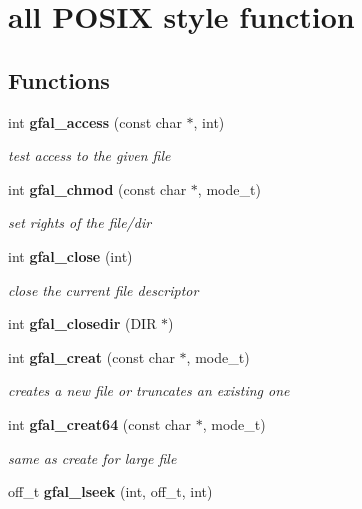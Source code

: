 \section{all POSIX style function}
\label{group__posix__group}
\subsection*{Functions}
\begin{DoxyCompactItemize}
\item 
int {\bf gfal\_\-access} (const char $\ast$, int)
\begin{DoxyCompactList}\small\item\em test access to the given file \item\end{DoxyCompactList}\item 
int {\bf gfal\_\-chmod} (const char $\ast$, mode\_\-t)
\begin{DoxyCompactList}\small\item\em set rights of the file/dir \item\end{DoxyCompactList}\item 
int {\bf gfal\_\-close} (int)
\begin{DoxyCompactList}\small\item\em close the current file descriptor \item\end{DoxyCompactList}\item 
int {\bfseries gfal\_\-closedir} (DIR $\ast$)\label{group__posix__group_gab62f647bfe55cf9314d77d58dd3c992b}

\item 
int {\bf gfal\_\-creat} (const char $\ast$, mode\_\-t)
\begin{DoxyCompactList}\small\item\em creates a new file or truncates an existing one \item\end{DoxyCompactList}\item 
int {\bf gfal\_\-creat64} (const char $\ast$, mode\_\-t)\label{group__posix__group_ga718e537647901c4602a2de32e03ed315}

\begin{DoxyCompactList}\small\item\em same as create for large file \item\end{DoxyCompactList}\item 
off\_\-t {\bfseries gfal\_\-lseek} (int, off\_\-t, int)\label{group__posix__group_gabe7bccef8678d809c7be0343c510e76b}


\end{DoxyCompactItemize}
